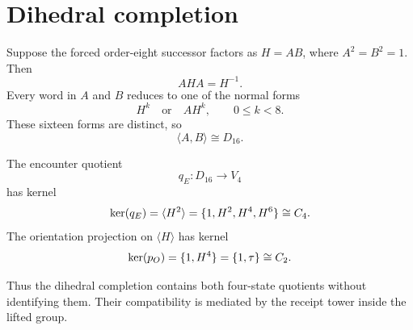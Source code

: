 \section{Dihedral completion}

Suppose the forced order-eight successor factors as \(H=AB\), where
\(A^2=B^2=1\). Then
\[
AHA=H^{-1}.
\]
Every word in \(A\) and \(B\) reduces to one of the normal forms
\[
H^k
\quad\text{or}\quad
AH^k,
\qquad 0\leq k<8.
\]
These sixteen forms are distinct, so
\[
\langle A,B\rangle\cong D_{16}.
\]

The encounter quotient
\[
q_E:D_{16}\longrightarrow V_4
\]
has kernel
\[
\operatorname{ker}(q_E)=\langle H^2\rangle
=\{1,H^2,H^4,H^6\}\cong C_4.
\]
The orientation projection on \(\langle H\rangle\) has kernel
\[
\operatorname{ker}(p_O)=\{1,H^4\}=\{1,\tau\}\cong C_2.
\]

Thus the dihedral completion contains both four-state quotients
without identifying them. Their compatibility is mediated by the
receipt tower inside the lifted group.
